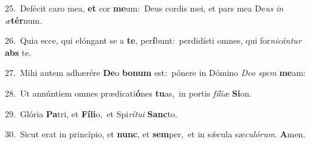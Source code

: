 {\numbfont\textcolor{\numbcolor}{25.}}~Defécit caro mea, \textbf{et} cor \textbf{me}\-um:~\star Deus cordis mei, et pars mea De\textit{us} \textit{in} \textit{æ}\-\textbf{tér}num.\par
{\numbfont\textcolor{\numbcolor}{26.}}~Quia ecce, qui elóngant se a \textbf{te}\-, per\-\textbf{í}\-bunt:~\star perdidísti omnes, qui for\-\textit{ni}\-\textit{cán}\textit{tur} \textbf{abs} te.\par
{\numbfont\textcolor{\numbcolor}{27.}}~Mihi autem adhærére \textbf{De}\-o \textbf{bo}\-\textbf{num} est:~\star pónere in Dómino \textit{De}\-\textit{o} \textit{spem} \textbf{me}\-am:\par
{\numbfont\textcolor{\numbcolor}{28.}}~Ut annúntiem omnes prædicati\-\textbf{ó}\-nes \textbf{tu}\-as,~\star in portis \textit{fí}\-\textit{li}\textit{æ} \textbf{Si}\-on.\par
{\numbfont\textcolor{\numbcolor}{29.}}~Glória \textbf{Pa}\-tri, et \textbf{Fí}\-\textbf{li}o,~\star et Spi\-\textit{rí}\-\textit{tu}\textit{i} \textbf{Sanc}\-to.\par
{\numbfont\textcolor{\numbcolor}{30.}}~Sicut erat in princípio, et \textbf{nunc}\-, et \textbf{sem}\-per,~\star et in sǽcula sæ\-\textit{cu}\-\textit{ló}\textit{rum}. \textbf{A}\-men.\par
